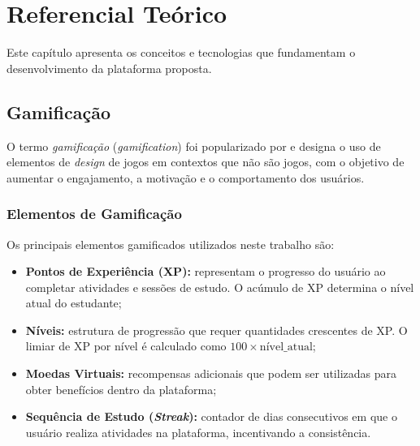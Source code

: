 
\chapter{Referencial Teórico}
\label{cap:referencial}

Este capítulo apresenta os conceitos e tecnologias que fundamentam o desenvolvimento
da plataforma proposta.

\section{Gamificação}
\label{sec:gamificacao}

O termo \textit{gamificação} (\textit{gamification}) foi popularizado por
 e designa o uso de elementos de \textit{design}
de jogos em contextos que não são jogos, com o objetivo de aumentar o engajamento,
a motivação e o comportamento dos usuários.

\subsection{Elementos de Gamificação}
\label{subsec:elementos-gamificacao}

Os principais elementos gamificados utilizados neste trabalho são:

\begin{itemize}
  \item \textbf{Pontos de Experiência (XP):} representam o progresso do usuário ao
        completar atividades e sessões de estudo. O acúmulo de XP determina o nível
        atual do estudante;

  \item \textbf{Níveis:} estrutura de progressão que requer quantidades crescentes
        de XP. O limiar de XP por nível é calculado como $100 \times \text{nível\_atual}$;

  \item \textbf{Moedas Virtuais:} recompensas adicionais que podem ser utilizadas
        para obter benefícios dentro da plataforma;

  \item \textbf{Sequência de Estudo (\textit{Streak}):} contador de dias consecutivos
        em que o usuário realiza atividades na plataforma, incentivando a consistência.
\end{itemize}

